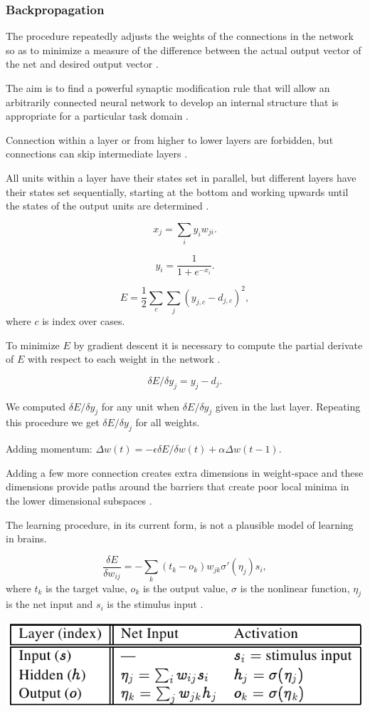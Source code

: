 
\subsubsection{Backpropagation}

The procedure repeatedly adjusts the weights of the connections in the network so as to minimize a measure of the difference between the actual output vector of the net and desired output vector \cite{rumelhart1986learning}. 

The aim is to find a powerful synaptic modification rule that will allow an arbitrarily connected neural network to develop an internal structure that is appropriate for a particular task domain \cite{rumelhart1986learning}. 

Connection within a layer or from higher to lower layers are forbidden, but connections can skip intermediate layers \cite{rumelhart1986learning}.

All units within a layer have their states set in parallel, but different layers have their states set sequentially, starting at the bottom and working upwards until the states of the output units are determined \cite{rumelhart1986learning}. 

$$x_j = \sum_i y_iw_{ji}.$$

$$y_i = \frac{1}{1 + e^{-x_i}}.$$

$$E = \frac{1}{2} \sum_c \sum_j (y_{j,c} - d_{j,c})^2,$$
where $c$ is index over cases. 

To minimize $E$ by gradient descent it is necessary to compute the partial derivate of $E$ with respect to each weight in the network \cite{rumelhart1986learning}. 

$$\delta E / \delta y_j = y_j - d_j.$$

We computed $\delta E / \delta y_j$ for any unit when $\delta E / \delta y_j$ given in the last layer. Repeating this procedure we get $\delta E / \delta y_j$ for all weights. 

Adding momentum:
$\Delta w(t) = -\epsilon \delta E/ \delta w(t) + \alpha \Delta w(t-1).$

Adding a few more connection creates extra dimensions in weight-space and these dimensions provide paths around the barriers that create poor local minima in the lower dimensional subspaces \cite{rumelhart1986learning}. 

The learning procedure, in its current form, is not a plausible model of learning in brains. 

$$\frac{\delta E}{\delta w_{ij}} = -\sum_k(t_k-o_k)w_{jk}\sigma'(\eta_j)s_i,$$
where $t_k$ is the target value, $o_k$ is the output value, $\sigma$ is the nonlinear function, $\eta_j$ is the net input and $s_i$ is the stimulus input \cite{o1996bio}.

\begin{center} 
\includegraphics{img/table_bp.png} 
\cite{farkas2013bal} 
\end{center} 
